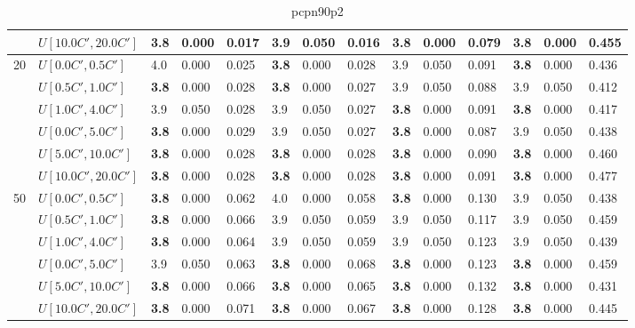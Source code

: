 \begin{table}[h]
{\begin{tabular}{|l|l||l|l|l||l|l|l||l|l|l||l|l|l|}
       & $U[10.0C',20.0C']$ & \textbf{3.8} & 0.000 & 0.017 & 3.9 & 0.050 & 0.016 & \textbf{3.8} & 0.000 & 0.079 & \textbf{3.8} & 0.000 & 0.455 \\
      \hline\hline
      \multirow{6}{*}{20} & $U[0.0C',0.5C']$ & 4.0 & 0.000 & 0.025 & \textbf{3.8} & 0.000 & 0.028 & 3.9 & 0.050 & 0.091 & \textbf{3.8} & 0.000 & 0.436 \\
       & $U[0.5C',1.0C']$ & \textbf{3.8} & 0.000 & 0.028 & \textbf{3.8} & 0.000 & 0.027 & 3.9 & 0.050 & 0.088 & 3.9 & 0.050 & 0.412 \\
       & $U[1.0C',4.0C']$ & 3.9 & 0.050 & 0.028 & 3.9 & 0.050 & 0.027 & \textbf{3.8} & 0.000 & 0.091 & \textbf{3.8} & 0.000 & 0.417 \\
       & $U[0.0C',5.0C']$ & \textbf{3.8} & 0.000 & 0.029 & 3.9 & 0.050 & 0.027 & \textbf{3.8} & 0.000 & 0.087 & 3.9 & 0.050 & 0.438 \\
       & $U[5.0C',10.0C']$ & \textbf{3.8} & 0.000 & 0.028 & \textbf{3.8} & 0.000 & 0.028 & \textbf{3.8} & 0.000 & 0.090 & \textbf{3.8} & 0.000 & 0.460 \\
       & $U[10.0C',20.0C']$ & \textbf{3.8} & 0.000 & 0.028 & \textbf{3.8} & 0.000 & 0.028 & \textbf{3.8} & 0.000 & 0.091 & \textbf{3.8} & 0.000 & 0.477 \\
      \hline\hline
      \multirow{6}{*}{50} & $U[0.0C',0.5C']$ & \textbf{3.8} & 0.000 & 0.062 & 4.0 & 0.000 & 0.058 & \textbf{3.8} & 0.000 & 0.130 & 3.9 & 0.050 & 0.438 \\
       & $U[0.5C',1.0C']$ & \textbf{3.8} & 0.000 & 0.066 & 3.9 & 0.050 & 0.059 & 3.9 & 0.050 & 0.117 & 3.9 & 0.050 & 0.459 \\
       & $U[1.0C',4.0C']$ & \textbf{3.8} & 0.000 & 0.064 & 3.9 & 0.050 & 0.059 & 3.9 & 0.050 & 0.123 & 3.9 & 0.050 & 0.439 \\
       & $U[0.0C',5.0C']$ & 3.9 & 0.050 & 0.063 & \textbf{3.8} & 0.000 & 0.068 & \textbf{3.8} & 0.000 & 0.123 & \textbf{3.8} & 0.000 & 0.459 \\
       & $U[5.0C',10.0C']$ & \textbf{3.8} & 0.000 & 0.066 & \textbf{3.8} & 0.000 & 0.065 & \textbf{3.8} & 0.000 & 0.132 & \textbf{3.8} & 0.000 & 0.431 \\
       & $U[10.0C',20.0C']$ & \textbf{3.8} & 0.000 & 0.071 & \textbf{3.8} & 0.000 & 0.067 & \textbf{3.8} & 0.000 & 0.128 & \textbf{3.8} & 0.000 & 0.445 \\
      \hline
      \end{tabular}
      }
      \caption{pcpn90p2}
      \label{tab:pcpn90p2}\end{table}
      
